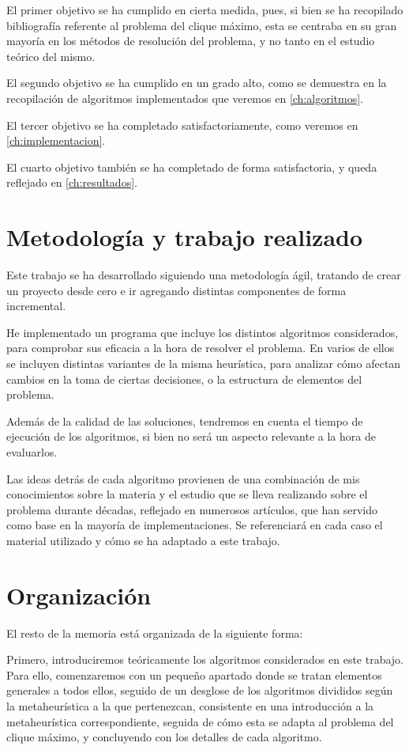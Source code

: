 El primer objetivo se ha cumplido en cierta medida, pues, si bien se ha recopilado
bibliografía referente al problema del clique máximo, esta se centraba en su gran
mayoría en los métodos de resolución del problema, y no tanto en el estudio teórico
del mismo.

El segundo objetivo se ha cumplido en un grado alto, como se demuestra en la recopilación
de algoritmos implementados que veremos en \autoref{ch:algoritmos}.

El tercer objetivo se ha completado satisfactoriamente, como veremos en \autoref{ch:implementacion}.

El cuarto objetivo también se ha completado de forma satisfactoria, y queda
reflejado en \autoref{ch:resultados}.

\section{Metodología y trabajo realizado}

Este trabajo se ha desarrollado siguiendo una metodología ágil, tratando de crear
un proyecto desde cero e ir agregando distintas componentes de forma incremental.


He implementado un programa que incluye los distintos algoritmos considerados,
para comprobar sus eficacia a la hora de resolver el problema.
En varios de ellos se incluyen distintas variantes de la misma heurística, para
analizar cómo afectan cambios en la toma de ciertas decisiones, o la estructura
de elementos del problema.

Además de la calidad de las soluciones, tendremos en cuenta el tiempo de ejecución
de los algoritmos, si bien no será un aspecto relevante a la hora de evaluarlos.

Las ideas detrás de cada algoritmo provienen de una combinación de mis conocimientos
sobre la materia y el estudio que se lleva realizando sobre el problema durante décadas,
reflejado en numerosos artículos, que han servido como base en la mayoría de implementaciones.
Se referenciará en cada caso el material utilizado y cómo se ha adaptado a este trabajo.

\section{Organización}

El resto de la memoria está organizada de la siguiente forma:

Primero, introduciremos teóricamente los algoritmos considerados en este trabajo.
Para ello, comenzaremos con un pequeño apartado donde se tratan elementos generales a
todos ellos, seguido de un desglose de los algoritmos divididos según la metaheurística
a la que pertenezcan, consistente en una introducción a la metaheurística correspondiente,
seguida de cómo esta se adapta al problema del clique máximo, y concluyendo con los
detalles de cada algoritmo.

